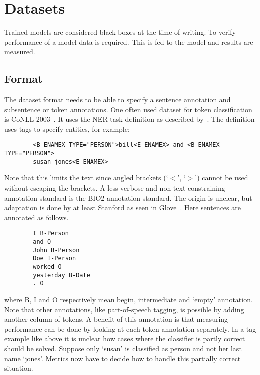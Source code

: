 \section{Datasets}
\label{sec:datasets}
Trained models are considered black boxes at the time of writing.
To verify performance of a model data is required.
This is fed to the model and results are measured.

\subsection{Format}
\label{subsec:format}
The dataset format needs to be able to specify a sentence annotation and subsentence or token annotations.
One often used dataset for token classification is CoNLL-2003~\citep{tjong2003}.
It uses the NER task definition as described by~\citet{chinchor1999}.
The definition uses tags to specify entities, for example:
\begin{center}
    \begin{verbatim}
        <B_ENAMEX TYPE="PERSON">bill<E_ENAMEX> and <B_ENAMEX TYPE="PERSON">
        susan jones<E_ENAMEX>
    \end{verbatim}
\end{center}
Note that this limits the text since angled brackets (`$<$', `$>$') cannot be used without escaping the brackets.
A less verbose and non text constraining annotation standard is the BIO2 annotation standard.
The origin is unclear, but adaptation is done by at least Stanford as seen in Glove~\citep{pennington2014}.
Here sentences are annotated as follows.
\begin{center}
    \begin{verbatim}
        I B-Person
        and O
        John B-Person
        Doe I-Person
        worked O
        yesterday B-Date
        . O
    \end{verbatim}
\end{center}
where B, I and O respectively mean begin, intermediate and `empty' annotation.
Note that other annotations, like part-of-speech tagging, is possible by adding another column of tokens.
A benefit of this annotation is that measuring performance can be done by looking at each token annotation separately.
In a tag example like above it is unclear how cases where the classifier is partly correct should be solved.
Suppose only `susan' is classified as person and not her last name `jones'.
Metrics now have to decide how to handle this partially correct situation.
